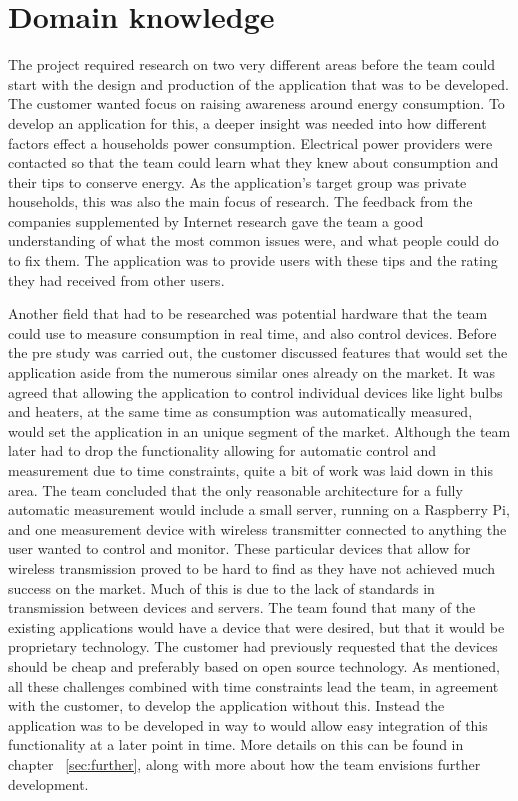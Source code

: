 \section{Domain knowledge}
The project required research on two very different areas before the team could start with the design and production of the application that was to be developed. The customer wanted focus on raising awareness around energy consumption. To develop an application for this, a deeper insight was needed into how different factors effect a households  power consumption. Electrical power providers were contacted so that the team could learn what they knew about consumption and their tips to conserve energy. As the application's target group was private households, this was also the main focus of research. The feedback from the companies supplemented by Internet research gave the team a good understanding of what the most common issues were, and what people could do to fix them. The application was to provide users with these tips and the rating they had received from other users. 

Another field that had to be researched was potential hardware that the team could use to measure consumption in real time, and also control devices. Before the pre study was carried out, the customer discussed features that would set the application aside from the numerous similar ones already on the market. It was agreed that allowing the application to control individual devices like light bulbs and heaters, at the same time as consumption was automatically measured, would set the application in an unique segment of the market. Although the team later had to drop the functionality allowing for automatic control and measurement due to time constraints, quite a bit of work was laid down in this area. The team concluded that the only reasonable architecture for a fully automatic measurement would include a small server, running on a Raspberry Pi, and one measurement device with wireless transmitter connected to anything the user wanted to control and monitor. These particular devices that allow for wireless transmission proved to be hard to find as they have not achieved much success on the market. Much of this is due to the lack of standards in transmission between devices and servers. The team found that many of the existing applications would have a device that were desired, but that it would be proprietary technology. The customer had previously requested that the devices should be cheap and preferably based on open source technology. As mentioned, all these challenges combined with time constraints lead the team, in agreement with the customer, to develop the application without  this. Instead the application was to be developed in way to would allow easy integration of this functionality at a later point in time. More details on this can be found in chapter ~\ref{sec:further}, along with more about how the team envisions further development. 